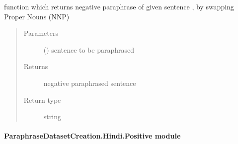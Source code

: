 \documentclass[letterpaper,10pt,english]{sphinxmanual}
\begin{document}
\begin{fulllineitems}
\begin{fulllineitems}
\label{\detokenize{ParaphraseDatasetCreation.Hindi:ParaphraseDatasetCreation.Hindi.Negative.Negative_Paraphrases.proper_noun_swap}}
function which returns negative paraphrase of given sentence , by swapping Proper Nouns (NNP)
\begin{quote}\begin{description}
\item[{Parameters}] \leavevmode
{} () \textendash{} sentence to be paraphrased

\item[{Returns}] \leavevmode
negative paraphrased sentence

\item[{Return type}] \leavevmode
string

\end{description}\end{quote}

\end{fulllineitems}


\end{fulllineitems}



\paragraph{ParaphraseDatasetCreation.Hindi.Positive module}
\label{\detokenize{ParaphraseDatasetCreation.Hindi:module-ParaphraseDatasetCreation.Hindi.Positive}}\label{\detokenize{ParaphraseDatasetCreation.Hindi:paraphrasedatasetcreation-hindi-positive-module}}
\end{document}
